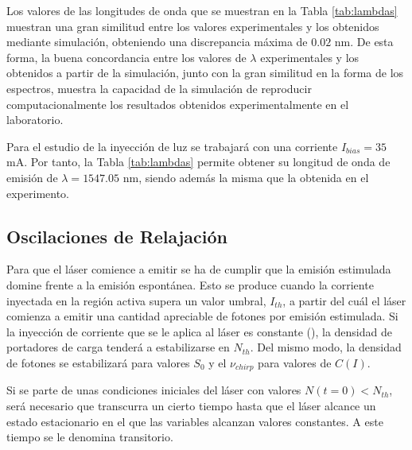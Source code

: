 	Los valores de las longitudes de onda que se muestran en la Tabla \ref{tab:lambdas} muestran una gran similitud entre los valores experimentales y los obtenidos mediante simulación, obteniendo una discrepancia máxima de $0.02$ nm. De esta forma, la buena concordancia entre los valores de $\lambda$ experimentales y los obtenidos a partir de la simulación, junto con la gran similitud en la forma de los espectros, muestra la capacidad de la simulación de reproducir computacionalmente los resultados obtenidos experimentalmente en el laboratorio.

	Para el estudio de la inyección de luz se trabajará con una corriente $I_{bias} = 35$ mA. Por tanto, la Tabla \ref{tab:lambdas} permite obtener su longitud de onda de emisión de $\lambda = 1547.05$ nm, siendo además la misma que la obtenida en el experimento.

\subsection{Oscilaciones de Relajación}
	\label{Sol:CW:RoF}

	Para que el láser comience a emitir se ha de cumplir que la emisión estimulada domine frente a la emisión espontánea. Esto se produce cuando la corriente inyectada en la región activa supera un valor umbral, $I_{th}$, a partir del cuál el láser comienza a emitir una cantidad apreciable de fotones por emisión estimulada. Si la inyección de corriente que se le aplica al láser es constante (\cw), la densidad de portadores de carga tenderá a estabilizarse en $N_{th}$. Del mismo modo, la densidad de fotones se estabilizará para valores $S_{0}$ y el $\nu_{chirp}$ para valores de $C(I)$.

	Si se parte de unas condiciones iniciales del láser con valores $N(t=0) < N_{th}$, será necesario que transcurra un cierto tiempo hasta que el láser alcance un estado estacionario en el que las variables alcanzan valores constantes. A este tiempo se le denomina transitorio.


